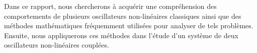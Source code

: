 Dans ce rapport, nous chercherons à acquérir une compréhension des 
comportements de plusieurs oscillateurs non-linéaires classiques ainsi que 
des méthodes mathématiques fréquemment utilisées pour analyser de tels problèmes. 
Ensuite, nous appliquerons ces méthodes dans l'étude d'un système 
de deux oscillateurs non-linéaires couplées.



